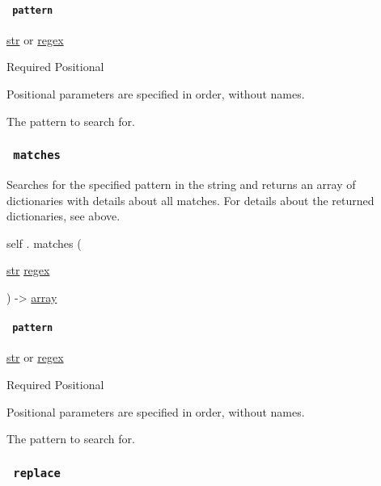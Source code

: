 \paragraph{\texorpdfstring{\texttt{\ pattern\ }}{ pattern }}\label{definitions-match-pattern}

\href{/docs/reference/foundations/str/}{str} {or}
\href{/docs/reference/foundations/regex/}{regex}

{Required} {{ Positional }}

\label{definitions-match-pattern-positional-tooltip}
Positional parameters are specified in order, without names.

The pattern to search for.

\subsubsection{\texorpdfstring{\texttt{\ matches\ }}{ matches }}\label{definitions-matches}

Searches for the specified pattern in the string and returns an array of
dictionaries with details about all matches. For details about the
returned dictionaries, see above.

self { . } { matches } (

{ \href{/docs/reference/foundations/str/}{str}
\href{/docs/reference/foundations/regex/}{regex} }

) -\textgreater{} \href{/docs/reference/foundations/array/}{array}

\paragraph{\texorpdfstring{\texttt{\ pattern\ }}{ pattern }}\label{definitions-matches-pattern}

\href{/docs/reference/foundations/str/}{str} {or}
\href{/docs/reference/foundations/regex/}{regex}

{Required} {{ Positional }}

\label{definitions-matches-pattern-positional-tooltip}
Positional parameters are specified in order, without names.

The pattern to search for.

\subsubsection{\texorpdfstring{\texttt{\ replace\ }}{ replace }}\label{definitions-replace}

